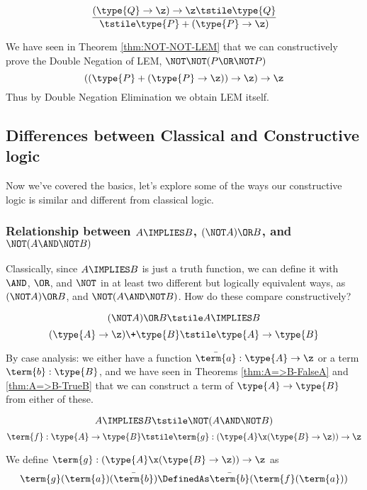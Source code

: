 \begin{Theorem}
\[
\frac{
(\type{Q} \to \z) \to \z \tstile \type{Q}
}{
\tstile \type{P} + (\type{P} \to \z)
}
\]
\end{Theorem}
\begin{Proof}
We have seen in Theorem \ref{thm:NOT-NOT-LEM} that we can constructively prove the Double Negation of LEM, $\NOT \NOT (P \OR \NOT P)$
\[
((\type{P} + (\type{P} \to \z)) \to \z) \to \z
\]
Thus by Double Negation Elimination we obtain LEM itself.
\end{Proof}


\subsection{Differences between Classical and Constructive logic}
\label{sec:DoingLogic-MoreResults}

Now we've covered the basics, let's explore some of the ways our constructive logic is similar and different from classical logic.


\subsubsection{Relationship between $A \IMPLIES B$, $(\NOT A) \OR B$, and $\NOT (A \AND \NOT B)$}

Classically, since $A \IMPLIES B$ is just a truth function, we can define it with $\AND$, $\OR$, and $\NOT$ in at least two different but logically equivalent ways, as $(\NOT A) \OR B$, and $\NOT (A \AND \NOT B)$.  How do these compare constructively?

\begin{Theorem}
\[
(\NOT A) \OR B
\tstile
A \IMPLIES B
\]
\[
(\type{A} \to \z) \+ \type{B}
\tstile
\type{A} \to \type{B}
\]
\end{Theorem}
\begin{Proof}
By case analysis: we either have a function 
$\bar{\term{a}}:\type{A} \to \z$ or a term $\term{b}:\type{B}$, and we have seen in Theorems \ref{thm:A=>B-FalseA} and \ref{thm:A=>B-TrueB} that we can construct a term of $\type{A} \to \type{B}$ from either of these.
\end{Proof}

\begin{Theorem}
\[
A \IMPLIES B
\tstile
\NOT (A \AND \NOT B)
\]
\[
\term{f}:\type{A} \to \type{B}
\tstile
\term{g}:(\type{A} \x (\type{B} \to \z)) \to \z
\]
\end{Theorem}
\begin{Proof}
We define $\term{g}:(\type{A} \x (\type{B} \to \z)) \to \z$ as
%
%
\[
\term{g}(\term{a})(\bar{\term{b}}) 
\DefinedAs 
\bar{\term{b}}(\term{f}(\term{a}))
\]
\end{Proof}



